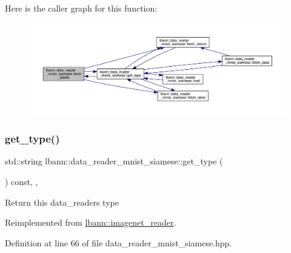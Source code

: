 Here is the caller graph for this function\+:\nopagebreak
\begin{figure}[H]
\begin{center}
\leavevmode
\includegraphics[width=350pt]{classlbann_1_1data__reader__mnist__siamese_a1709140fcdcea9baaaf1bab7a48f3bce_icgraph}
\end{center}
\end{figure}
\mbox{\label{classlbann_1_1data__reader__mnist__siamese_a2c5a29603f850bb0684dba1c64981604}} 
\subsubsection{\texorpdfstring{get\+\_\+type()}{get\_type()}}
{\footnotesize\ttfamily std\+::string lbann\+::data\+\_\+reader\+\_\+mnist\+\_\+siamese\+::get\+\_\+type (\begin{DoxyParamCaption}{ }\end{DoxyParamCaption}) const\hspace{0.3cm}{\ttfamily [inline]}, {\ttfamily [override]}, {\ttfamily [virtual]}}

Return this data\+\_\+reader\textquotesingle{}s type 

Reimplemented from \hyperlink{classlbann_1_1imagenet__reader_a0afea0db8b4286b56211842f8f1d7678}{lbann\+::imagenet\+\_\+reader}.



Definition at line 66 of file data\+\_\+reader\+\_\+mnist\+\_\+siamese.\+hpp.


